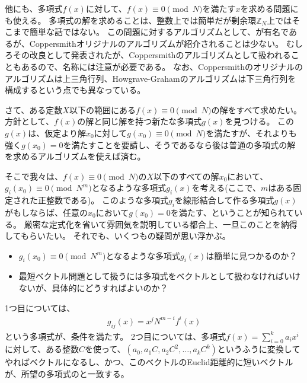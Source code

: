 他にも、多項式$f(x)$に対して、$f(x)\equiv0\pmod{N}$を満たす$x$を求める問題にも使える。
多項式の解を求めることは、整数上では簡単だが剰余環$\mathbb{Z}_N$上ではそこまで簡単な話ではない。
この問題に対するアルゴリズムとして、\cite{10.1007/3-540-68339-9_14, 10.1007/3-540-68339-9_16, 10.1007/s001459900030}が有名であるが、Coppersmithオリジナルのアルゴリズムが紹介されることは少ない。
むしろその改良として発表された\cite{10.1007/BFb0024458}が、Coppersmithのアルゴリズムとして扱われることもあるので、名称には注意が必要である。
なお、Coppersmithのオリジナルのアルゴリズムは上三角行列、Howgrave-Grahamのアルゴリズムは下三角行列を構成するという点でも異なっている。

さて、ある定数$X$以下の範囲にある$f(x)\equiv0\pmod{N}$の解をすべて求めたい。
方針として、$f(x)$の解と同じ解を持つ新たな多項式$g(x)$を見つける。
この$g(x)$は、仮定より解$x_0$に対して$g(x_0)\equiv0\pmod{N}$を満たすが、それよりも強く$g(x_0)=0$を満たすことを要請し、そうであるなら後は普通の多項式の解を求めるアルゴリズムを使えば済む。

そこで我々は、$f(x)\equiv0\pmod{N}$の$X$以下のすべての解$x_0$において、$g_i(x_0)\equiv0\pmod{N^m}$となるような多項式$g_i(x)$を考える(ここで、$m$はある固定された正整数である)。
このような多項式$g_i$を線形結合して作る多項式$g(x)$がもしならば、任意の$x_0$において$g(x_0)=0$を満たす、ということが知られている。
厳密な定式化を省いて雰囲気を説明している都合上、一旦このことを納得してもらいたい。
それでも、いくつもの疑問が思い浮かぶ。

\begin{itemize}
 \item $g_i(x_0)\equiv0\pmod{N^m}$となるような多項式$g_i(x)$は簡単に見つかるのか？
 \item 最短ベクトル問題として扱うには多項式をベクトルとして扱わなければいけないが、具体的にどうすればよいのか？
\end{itemize}

1つ目については、
\begin{align*}
g_{ij}(x) = x^j N^{m-i} f^i(x)
\end{align*}
という多項式が、条件を満たす。
2つ目については、多項式$f(x)=\sum_{i=0}^k a_ix^i$に対して、ある整数$C$を使って、$(a_0, a_1C, a_2C^2,\ldots, a_kC^k)$というふうに変換してやればベクトルになるし、かつ、このベクトルのEuclid距離的に短いベクトルが、所望の多項式のと一致する。


